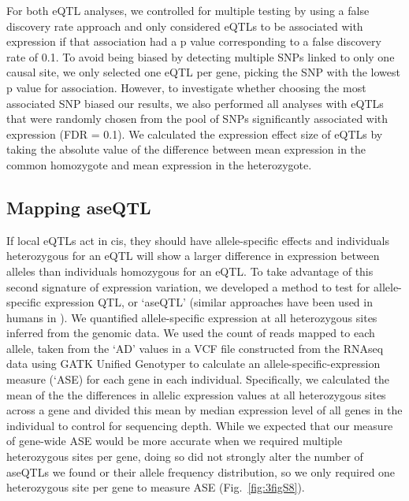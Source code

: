 For both eQTL analyses, we controlled for multiple testing by using a false discovery rate approach \citep{Storey} and only considered eQTLs to be associated with expression if that association had a p value corresponding to a false discovery rate of 0.1. To avoid being biased by detecting multiple SNPs linked to only one causal site, we only selected one eQTL per gene, picking the SNP with the lowest p value for association. However, to investigate whether choosing the most associated SNP biased our results, we also performed all analyses with eQTLs that were randomly chosen from the pool of SNPs significantly associated with expression (FDR = 0.1). We calculated the expression effect size of eQTLs by taking the absolute value of the difference between mean expression in the common homozygote and mean expression in the heterozygote. 

\subsection{Mapping aseQTL}
If local eQTLs act in cis, they should have allele-specific effects and individuals heterozygous for an eQTL will show a larger difference in expression between alleles than individuals homozygous for an eQTL. To take advantage of this second signature of expression variation, we developed a method to test for allele-specific expression QTL, or ‘aseQTL’ (similar approaches have been used in humans in \citet{Battle2014-ke}). We quantified allele-specific expression at all heterozygous sites inferred from the genomic data. We used the count of reads mapped to each allele, taken from the ‘AD’ values in a VCF file constructed from the RNAseq data using GATK Unified Genotyper to calculate an allele-specific-expression measure (‘ASE) for each gene in each individual. Specifically, we calculated the mean of the the differences in allelic expression values at all heterozygous sites across a gene and divided this mean by median expression level of all genes in the individual to control for sequencing depth. While we expected that our measure of gene-wide ASE would be more accurate when we required multiple heterozygous sites per gene, doing so did not strongly alter the number of aseQTLs we found or their allele frequency distribution, so we only required one heterozygous site per gene to measure ASE (Fig.~\ref{fig:3figS8}).

